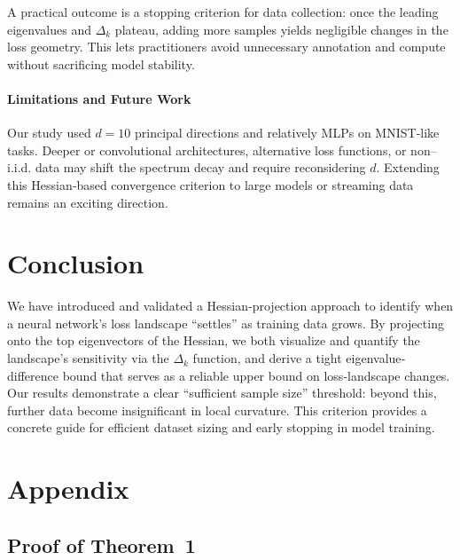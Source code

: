 \documentclass{article}
\begin{document}
A practical outcome is a stopping criterion for data collection: once the leading eigenvalues and $\Delta_k$ plateau,
adding more samples yields negligible changes in the loss geometry.  This lets practitioners avoid unnecessary annotation and
compute without sacrificing model stability.

\paragraph{Limitations and Future Work}
Our study used $d=10$ principal directions and relatively MLPs on MNIST‐like tasks. Deeper or convolutional architectures,
alternative loss functions, or non–i.i.d. data may shift the spectrum decay and require reconsidering $d$. Extending this Hessian‐based
convergence criterion to large models or streaming data remains an exciting direction.


\section{Conclusion}\label{sec:concl}

We have introduced and validated a Hessian‐projection approach to identify when a neural network’s loss landscape “settles” as
training data grows. By projecting onto the top eigenvectors of the Hessian, we both visualize and quantify the landscape’s
sensitivity via the $\Delta_k$ function, and derive a tight eigenvalue‐difference bound that serves as a reliable upper bound on
loss‐landscape changes. Our results demonstrate a clear “sufficient sample size” threshold: beyond this, further data become
insignificant in local curvature. This criterion provides a concrete guide for efficient dataset sizing and early stopping in
model training.



\nocite{*}





\newpage
\appendix
\section{Appendix}\label{app}

\subsection{Proof of Theorem~1}\label{app:th_1}
\end{document}
